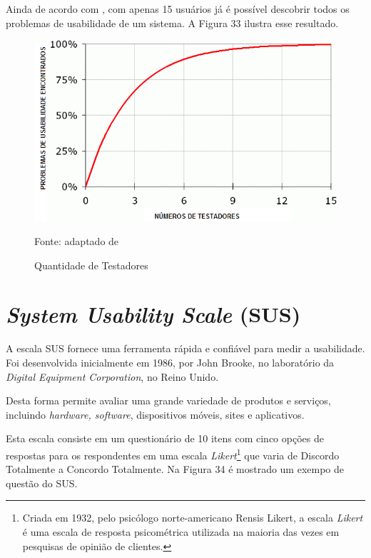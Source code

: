 \documentclass[
	12pt,				%
	openany,			%
	oneside,			%
	a4paper,			%
	english,			%
	french,				%
	spanish,			%
	brazil				%
	]{abntex2}
\begin{document}
Ainda de acordo com , com apenas 15 usuários já é possível descobrir todos os problemas de usabilidade de um sistema. A Figura 33 ilustra esse resultado.

\begin{figure}[H]
    \centering
\caption{Quantidade de Testadores}
\includegraphics[width=13cm]{figuras/numtestadores.png}
\par
 Fonte: adaptado de 
\end{figure}

\section{\textit{System Usability Scale} (SUS)}
A escala SUS fornece uma ferramenta rápida e confiável para medir a usabilidade. Foi desenvolvida inicialmente em 1986, por John Brooke, no laboratório da \textit{Digital Equipment Corporation}, no Reino Unido.

Desta forma permite avaliar uma grande variedade de produtos e serviços, incluindo \textit{hardware, software}, dispositivos móveis, sites e aplicativos.

Esta escala consiste em um questionário de 10 itens com cinco opções de respostas para os respondentes em uma escala \textit{Likert}\footnote{Criada em 1932, pelo psicólogo norte-americano Rensis Likert, a escala \textit{Likert} é uma escala de resposta psicométrica utilizada na maioria das vezes em pesquisas de opinião de clientes.} que varia de Discordo Totalmente a Concordo Totalmente. Na Figura 34 é mostrado um exempo de questão do SUS.
\end{document}
